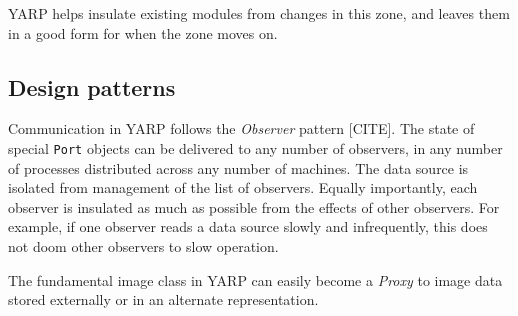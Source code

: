 YARP helps insulate existing modules from changes in this zone,
and leaves them in a good form for when the zone moves on.


\subsection*{Design patterns}

Communication in YARP follows the {\em Observer} pattern [CITE].  The state
of special {\tt Port} objects can be delivered to any number of
observers, in any number of processes distributed across any number of
machines.  The data source is isolated from management of the list
of observers.  Equally importantly, each observer is insulated as
much as possible from the effects of other observers.  For example,
if one observer reads a data source slowly and infrequently, this
does not doom other observers to slow operation.

The fundamental image class in YARP can easily become a {\em Proxy}
to image data stored externally or in an alternate representation.


